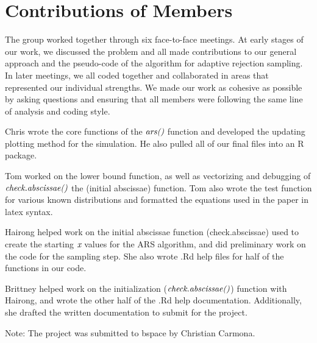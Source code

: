 \documentclass{article}\usepackage[]{graphicx}\usepackage[]{color}
\begin{document}
\section{Contributions of Members}
The group worked together through six face-to-face meetings.  At early stages of our work, we discussed the problem and all made contributions to our general approach and the pseudo-code of the algorithm for adaptive rejection sampling.  In later meetings, we all coded together and collaborated in areas that represented our individual strengths.  We made our work as cohesive as possible by asking questions and ensuring that all members were following the same line of analysis and coding style.

Chris wrote the core functions of the $\emph{ars()}$ function and developed the updating plotting method for the simulation.  He also pulled all of our final files into an R package.

Tom worked on the lower bound function, as well as vectorizing and debugging of $\emph{check.abscissae()}$ the (initial abscissae) function. Tom also wrote the test function for various known distributions and formatted the equations used in the paper in latex syntax.

Hairong helped work on the initial abscissae function (check.abscissae) used to create the starting $\emph{x}$ values for the ARS algorithm, and did preliminary work on the code for the sampling step.  She also wrote .Rd help files for half of the functions in our code.

Brittney helped work on the initialization ($\emph{check.abscissae()}$) function with Hairong, and wrote the other half of the .Rd help documentation.  Additionally, she drafted the written documentation to submit for the project.


Note: The project was submitted to bspace by Christian Carmona.
\end{document}
